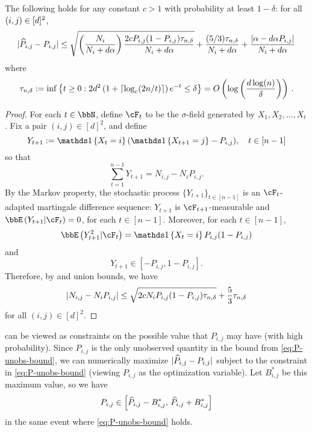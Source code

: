 \begin{lemma}
  \label{lem:P-unobs-bound}
  The following holds for any constant $c>1$ with probability at least
  $1-\delta$: for all $(i,j) \in [d]^2$,
  \begin{equation}
    | \widehat{P}_{i,j} - P_{i,j} |
    \leq
    \sqrt{\left(\frac{N_i}{N_i+d\alpha}\right)\frac{2cP_{i,j}(1-P_{i,j})\tau_{n,\delta}}{N_i+d\alpha}}
    + \frac{(5/3)\tau_{n,\delta}}{N_i+d\alpha}
    + \frac{|\alpha-d\alpha P_{i,j}|}{N_i+d\alpha}
    \label{eq:P-unobs-bound}
  \end{equation}
  where
  \begin{equation}
    \tau_{n,\delta}
    := \inf
    \left\{
      t\geq0 :
      2d^2 \left( 1 + \lceil\log_c(2n/t)\rceil \right) e^{-t} \leq \delta
    \right\}
    = O\left( \log\left( \frac{d\log(n)}{\delta} \right) \right)
    \,.
    \label{eq:emptail}
  \end{equation}
\end{lemma}
\begin{proof}
  For each $t \in \bbN$, define $\cF_t$ to be the $\sigma$-field
  generated by $X_1,X_2,\dotsc,X_t$.
  Fix a pair $(i,j) \in [d]^2$, and define
  \[
    Y_{t+1} := \Ind{X_t = i} (\Ind{X_{t+1}=j} - P_{i,j})
    , \quad t \in [n-1]
  \]
  so that
  \[
    \sum_{t=1}^{n-1} Y_{t+1}
    = N_{i,j} - N_i P_{i,j}
    .
  \]
  By the Markov property, the stochastic process $\{ Y_{t+1} \}_{t \in
  [n-1]}$ is an $\cF_t$-adapted martingale difference sequence:
  $Y_{t+1}$ is $\cF_{t+1}$-measurable and $\EE{Y_{t+1}| \cF_t } = 0$,
  for each $t \in [n-1]$.
  Moreover, for each $t \in [n-1]$,
  \[
    \EE{Y_{t+1}^2| \cF_t } = \Ind{X_t=i} P_{i,j} (1-P_{i,j})
  \]
  and
  \[
    Y_{t+1} \in [-P_{i,j},1-P_{i,j}] .
  \]
  Therefore, by  and union bounds, we have
  \[
    | N_{i,j} - N_i P_{i,j} |
    \leq \sqrt{2c N_i P_{i,j} (1-P_{i,j}) \tau_{n,\delta}} + \frac53
    \tau_{n,\delta}
  \]
  for all $(i,j) \in [d]^2$.
\end{proof}

 can be viewed as constraints on the possible
value that $P_{i,j}$ may have (with high probability).
Since $P_{i,j}$ is the only unobserved quantity in the bound from
\cref{eq:P-unobs-bound}, we can numerically maximize $|\widehat{P}_{i,j} -
P_{i,j}|$ subject to the constraint in \cref{eq:P-unobs-bound}
(viewing $P_{i,j}$ as the optimization variable).
Let $B_{i,j}^*$ be this maximum value, so we have
\[
  P_{i,j} \in
  \left[
    \widehat{P}_{i,j} - B_{i,j}^*,\,
    \widehat{P}_{i,j} + B_{i,j}^*
  \right]
\]
in the same event where \cref{eq:P-unobs-bound} holds.

